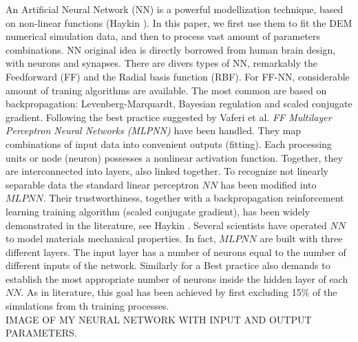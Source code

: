 An Artificial Neural Network (NN) is a powerful modellization technique, based
on non-linear functions (Haykin \cite{RefWorks:158}). In this paper, we first use them to fit the DEM
numerical simulation data, and then to process vast amount of parameters combinations.
NN original idea is directly borrowed from human brain design, with neurons and
synapses.
There are divers types of NN, remarkably the Feedforward (FF) and the Radial
basis function (RBF). For FF-NN, considerable
amount of traning algorithms are available. The most common are based on
backpropagation: Levenberg-Marquardt, Bayesian regulation and scaled conjugate
gradient. Following the best practice suggested by Vaferi et al. \cite{RefWorks:150}
\textit{FF Multilayer Perceptron Neural Networks (MLPNN)} have been
handled. They map combinations of input data into convenient outputs (fitting).
Each processing units or node (neuron) possesses a nonlinear activation
function. Together, they are interconnected into layers, also linked together.
To recognize not linearly separable data the standard 
linear perceptron $NN$ has been modified into $MLPNN$.
Their trustworthiness, together with a backpropagation reinforcement
learning training algorithm (scaled conjugate gradient), has been widely
demonstrated in the literature, see Haykin \cite{RefWorks:158}.
Several scientists \cite{RefWorks:161, RefWorks:166, RefWorks:167, RefWorks:168, RefWorks:169,
RefWorks:170} have operated $NN$ to model materials mechanical properties.
In fact, $MLPNN$ are built with three different layers.
The input layer has a number of neurons equal to the number of different inputs
of the network. Similarly for a Best practice also demands to establish the
most appropriate number of neurons inside the hidden layer of each $NN$.
As in literature, this goal has been achieved by first excluding 15\% of the
simulations from th  training processes.\\
%


IMAGE OF MY NEURAL NETWORK WITH INPUT AND OUTPUT PARAMETERS. \\
